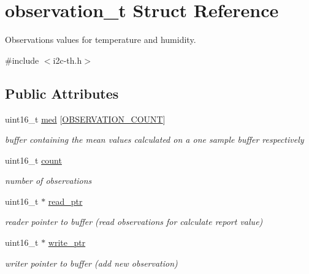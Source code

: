 \hypertarget{structobservation__t}{}\section{observation\+\_\+t Struct Reference}
\label{structobservation__t}


Observations values for temperature and humidity.  




{\ttfamily \#include $<$i2c-\/th.\+h$>$}

\subsection*{Public Attributes}
\begin{DoxyCompactItemize}
\item 
\mbox{\label{structobservation__t_aad8e1d07411a80498c8752203698d051}} 
uint16\+\_\+t \hyperlink{structobservation__t_aad8e1d07411a80498c8752203698d051}{med} \mbox{[}\hyperlink{sensors__config_8h_a59ca9f7c75d5ef71f2292b4f8e136159}{O\+B\+S\+E\+R\+V\+A\+T\+I\+O\+N\+\_\+\+C\+O\+U\+NT}\mbox{]}
\begin{DoxyCompactList}\small\item\em buffer containing the mean values calculated on a one sample buffer respectively \end{DoxyCompactList}\item 
\mbox{\label{structobservation__t_ad6f76e88d5cc669742e8d815682e56c2}} 
uint16\+\_\+t \hyperlink{structobservation__t_ad6f76e88d5cc669742e8d815682e56c2}{count}
\begin{DoxyCompactList}\small\item\em number of observations \end{DoxyCompactList}\item 
\mbox{\label{structobservation__t_a0fec54c85b3fcd095772a58c8d877845}} 
uint16\+\_\+t $\ast$ \hyperlink{structobservation__t_a0fec54c85b3fcd095772a58c8d877845}{read\+\_\+ptr}
\begin{DoxyCompactList}\small\item\em reader pointer to buffer (read observations for calculate report value) \end{DoxyCompactList}\item 
\mbox{\label{structobservation__t_aa912e839aff97f27a86387fc765fc7df}} 
uint16\+\_\+t $\ast$ \hyperlink{structobservation__t_aa912e839aff97f27a86387fc765fc7df}{write\+\_\+ptr}
\begin{DoxyCompactList}\small\item\em writer pointer to buffer (add new observation) \end{DoxyCompactList}\end{DoxyCompactItemize}


